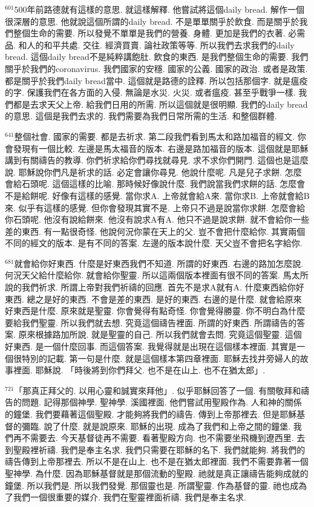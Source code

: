 \documentclass{book}
\begin{document}
$^{601}$500年前路德就有這樣的意思.
就這樣解釋.
他嘗試將這個daily bread.
解作一個很深層的意思.
他就說這個所謂的daily bread.
不是單單關乎於飲食.
而是關乎於我們整個生命的需要.
所以發覺不單單是我們的營養.
身體.
更加是我們的衣著.
必需品.
和人的和平共處.
交往.
經濟買賣.
論社政策等等.
所以我們去求我們的daily bread.
這個daily bread不是純粹講飽肚.
飲食的東西.
是我們整個生命的需要.
我們關乎於我們的coronavirus.
我們國家的安穩.
國家的公義.
國家的政治.
或者是政策.
都是關乎於我們daily bread當中.
這個就是路德的詮釋.
所以包括那個字.
就是瘟疫的字.
保護我們在各方面的入侵.
無論是水災.
火災.
或者瘟疫.
甚至乎戰爭一樣.
我們都是去求天父上帝.
給我們日用的所需.
所以這個就是很明顯.
我們的daily bread的意思.
這個是我們去求的.
我們需要為我們日常所需的生活.
和整個群體.

$^{641}$整個社會.
國家的需要.
都是去祈求.
第二段我們看到馬太和路加福音的經文.
你會發現有一個比較.
左邊是馬太福音的版本.
右邊是路加福音的版本.
這個就是耶穌講到有關禱告的教導.
你們祈求給你們尋找就尋見.
求不求你們開門.
這個也是這麼說.
耶穌說你們凡是祈求的話.
必定會讓你尋見.
他說什麼呢.
凡是兒子求餅.
怎麼會給石頭呢.
這個這樣的比喻.
那時候好像說什麼.
我們說當我們求餅的話.
怎麼會不是給餅呢.
好像有這樣的感覺.
當你求A.
上帝就會給A來.
當你求B.
上帝就會給B來.
似乎有這樣的感覺.
但你會發現其實不是.
上帝只不過是說當你求餅.
怎麼會給你石頭呢.
他沒有說給餅來.
他沒有說求A有A.
他只不過是說求餅.
就不會給你一些差的東西.
有一點很奇怪.
他說何況你蒙在天上的父.
豈不會把什麼給你.
其實兩個不同的經文的版本.
是有不同的答案.
左邊的版本說什麼.
天父豈不會把名字給你.

$^{681}$就會給你好東西.
什麼是好東西我們不知道.
所謂的好東西.
右邊的路加怎麼說.
何況天父給什麼給你.
就會給你聖靈.
所以這兩個版本裡面有很不同的答案.
馬太所說的我們祈求.
所謂上帝對我們祈禱的回應.
首先不是求A就有A.
什麼東西給你好東西.
總之是好的東西.
不會是差的東西.
是好的東西.
右邊的是什麼.
就會給原來好東西是什麼.
原來就是聖靈.
你會覺得有點奇怪.
你會覺得勝靈.
你不明白為什麼要給我們聖靈.
所以我們就去想.
究竟這個禱告裡面.
所謂的好東西.
所謂禱告的答案.
原來根據路加所說.
就是聖靈的自己.
所以我們就會去問.
究竟這個聖靈.
這個好東西.
是一個什麼回事.
而這個答案.
我覺得就是出現在這個樣本裡面.
其實是一個很特別的記載.
第一句是什麼.
就是這個樣本第四章裡面.
耶穌去找井旁婦人的故事裡面.
耶穌說.
「時後將到你們拜父.
也不是在山上.
也不在猶太郎」.

$^{721}$「那真正拜父的.
以用心靈和誠實來拜他」.
似乎耶穌回答了一個.
有關敬拜和禱告的問題.
記得那個神學.
聖神學.
溪國裡面.
他們嘗試用聖殿作為.
人和神的關係的鐘堡.
我們要藉著這個聖殿.
才能夠將我們的禱告.
傳到上帝那裡去.
但是耶穌基督的彌臨.
說了什麼.
就是說原來.
耶穌的出現.
成為了我們和上帝之間的鐘堡.
我們再不需要去.
今天基督徒再不需要.
看著聖殿方向.
也不需要坐飛機到遼西里.
去到聖殿裡祈禱.
我們是奉主名求.
我們只需要在耶穌的名下.
我們就能夠.
將我們的禱告傳到上帝那裡去.
所以不是在山上.
也不是在猶太郎裡面.
我們不需要靠著一個聖神學.
為什麼.
因為耶穌基督就是那個流動的聖殿.
祂就是真正讓禱告能夠成就的鐘堡.
所以我們是.
所以我們發覺.
那個靈也是.
所謂聖靈.
作為基督的靈.
祂也成為了我們一個很重要的媒介.
我們在聖靈裡面祈禱.
我們是奉主名求.
\end{document}
